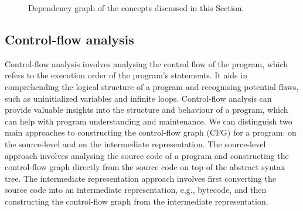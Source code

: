 \begin{figure}[h]
    \centering
  \caption{Dependency graph of the concepts discussed in this Section.}
\end{figure}


\subsection{Control-flow analysis}

Control-flow analysis involves analysing the control flow of the program, which refers
to the execution order of the program's statements. It aids in comprehending the logical
structure of a program and recognising potential flaws, such as uninitialized variables
and infinite loops. Control-flow analysis
can provide valuable insights into the structure and behaviour of a program,
which can help with program understanding and maintenance.
We can distinguish two main approaches to constructing the control-flow graph (CFG) for a program:
on the source-level and on the intermediate representation. The source-level approach
involves analysing the source code of a program and constructing the control-flow graph
directly from the source code on top of the abstract syntax tree. The intermediate representation approach involves
first converting the source code into an intermediate representation, e.g., bytecode,
and then constructing the control-flow graph from the intermediate representation.

